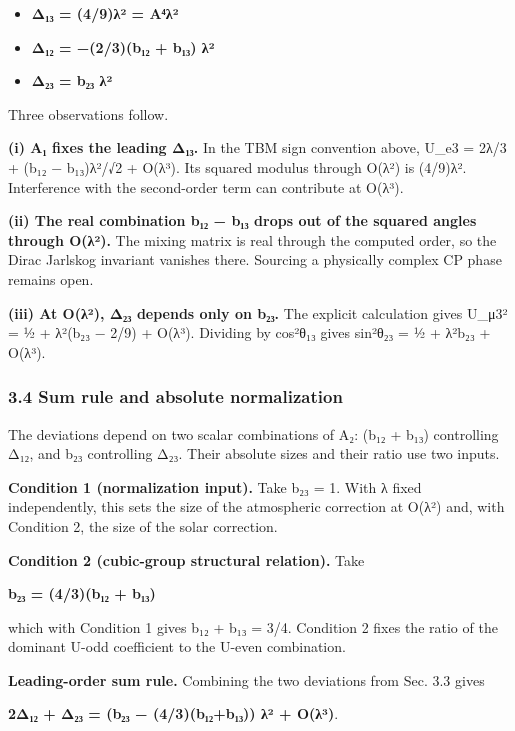 \documentclass[
]{article}
\providecommand{\tightlist}{%
  \setlength{\itemsep}{0pt}\setlength{\parskip}{0pt}}
\begin{document}
\begin{itemize}
\tightlist
\item
  \textbf{Δ₁₃ = (4/9)λ² = A⁴λ²}
\item
  \textbf{Δ₁₂ = −(2/3)(b₁₂ + b₁₃) λ²}
\item
  \textbf{Δ₂₃ = b₂₃ λ²}
\end{itemize}

Three observations follow.

\textbf{(i) A₁ fixes the leading Δ₁₃.} In the TBM sign convention above,
U\_e3 = 2λ/3 + (b₁₂ − b₁₃)λ²/√2 + O(λ³). Its squared modulus through
O(λ²) is (4/9)λ². Interference with the second-order term can contribute
at O(λ³).

\textbf{(ii) The real combination b₁₂ − b₁₃ drops out of the squared
angles through O(λ²).} The mixing matrix is real through the computed
order, so the Dirac Jarlskog invariant vanishes there. Sourcing a
physically complex CP phase remains open.

\textbf{(iii) At O(λ²), Δ₂₃ depends only on b₂₃.} The explicit
calculation gives \textbar U\_μ3\textbar² = ½ + λ²(b₂₃ − 2/9) + O(λ³).
Dividing by cos²θ₁₃ gives sin²θ₂₃ = ½ + λ²b₂₃ + O(λ³).

\hypertarget{sum-rule-and-absolute-normalization}{%
\subsubsection{3.4 Sum rule and absolute
normalization}\label{sum-rule-and-absolute-normalization}}

The deviations depend on two scalar combinations of A₂: (b₁₂ + b₁₃)
controlling Δ₁₂, and b₂₃ controlling Δ₂₃. Their absolute sizes and their
ratio use two inputs.

\textbf{Condition 1 (normalization input).} Take b₂₃ = 1. With λ fixed
independently, this sets the size of the atmospheric correction at O(λ²)
and, with Condition 2, the size of the solar correction.

\textbf{Condition 2 (cubic-group structural relation).} Take

\textbf{b₂₃ = (4/3)(b₁₂ + b₁₃)}

which with Condition 1 gives b₁₂ + b₁₃ = 3/4. Condition 2 fixes the
ratio of the dominant U-odd coefficient to the U-even combination.

\textbf{Leading-order sum rule.} Combining the two deviations from Sec.
3.3 gives

\textbf{2Δ₁₂ + Δ₂₃ = (b₂₃ − (4/3)(b₁₂+b₁₃)) λ² + O(λ³)}.
\end{document}
